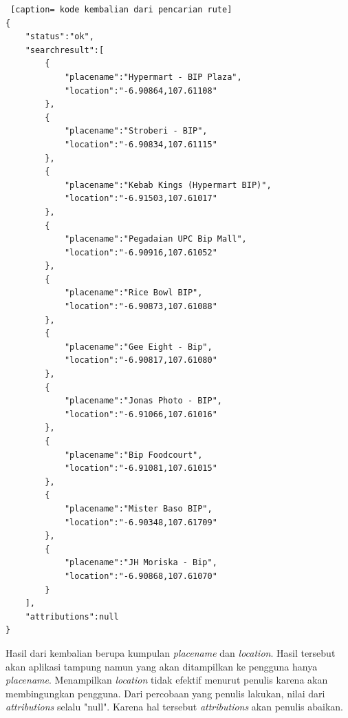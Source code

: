 \begin{lstlisting} [caption= kode kembalian dari pencarian rute]
{ 
	"status":"ok",
	"searchresult":[
		{
			"placename":"Hypermart - BIP Plaza",
			"location":"-6.90864,107.61108"
		},
		{
			"placename":"Stroberi - BIP",
			"location":"-6.90834,107.61115"
		},
		{
			"placename":"Kebab Kings (Hypermart BIP)",
			"location":"-6.91503,107.61017"
		},
		{
			"placename":"Pegadaian UPC Bip Mall",
			"location":"-6.90916,107.61052"
		},
		{
			"placename":"Rice Bowl BIP",
			"location":"-6.90873,107.61088"
		},
		{	
			"placename":"Gee Eight - Bip",
			"location":"-6.90817,107.61080"
		},
		{
			"placename":"Jonas Photo - BIP",
			"location":"-6.91066,107.61016"
		},
		{
			"placename":"Bip Foodcourt",
			"location":"-6.91081,107.61015"
		},
		{
			"placename":"Mister Baso BIP",
			"location":"-6.90348,107.61709"
		},
		{
			"placename":"JH Moriska - Bip",
			"location":"-6.90868,107.61070"
		}
	],
	"attributions":null
}
\end{lstlisting}

\hspace{0.5cm} Hasil dari kembalian berupa kumpulan \textit{placename} dan \textit{location}. Hasil tersebut akan aplikasi tampung namun yang akan ditampilkan ke pengguna hanya \textit{placename}. Menampilkan \textit{location} tidak efektif menurut penulis karena akan membingungkan pengguna. Dari percobaan yang penulis lakukan, nilai dari \textit{attributions} selalu "null". Karena hal tersebut \textit{attributions} akan penulis abaikan.

